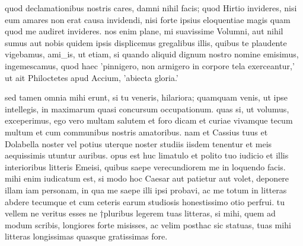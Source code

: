 


 quod declamationibus nostris cares, damni nihil facis; quod Hirtio invideres, nisi eum amares non erat causa invidendi, nisi forte ipsius eloquentiae magis quam quod me audiret invideres. nos enim plane, mi suavissime Volumni, aut nihil sumus aut nobis quidem ipsis displicemus gregalibus illis, quibus te plaudente vigebamus, ami_is, ut etiam, si quando aliquid dignum nostro nomine emisimus, ingemescamus, quod haec 'pinnigero, non armigero in corpore tela exerceantur,' ut ait Philoctetes apud Accium, 'abiecta gloria.'

 sed tamen omnia mihi erunt, si tu veneris, hilariora; quamquam venis, ut ipse intellegis, in maximarum quasi concursum occupationum. quas si, ut volumus, exceperimus, ego vero multam salutem et foro dicam et curiae vivamque tecum multum et cum communibus nostris amatoribus. nam et Cassius tuus et Dolabella noster vel potius uterque noster studiis iisdem tenentur et meis aequissimis utuntur auribus. opus est huc limatulo et polito tuo iudicio et illis interioribus litteris Emeisi, quibus saepe verecundiorem me in loquendo facis. mihi enim iudicatum est, si modo hoc Caesar aut patietur aut volet, deponere illam iam personam, in qua me saepe illi ipsi probavi, ac me totum in litteras abdere tecumque et cum ceteris earum studiosis honestissimo otio perfrui. tu vellem ne veritus esses ne †pluribus legerem tuas litteras, si mihi, quem ad modum scribis, longiores forte misisses, ac velim posthac sic statuas, tuas mihi litteras longissimas quasque gratissimas fore.

